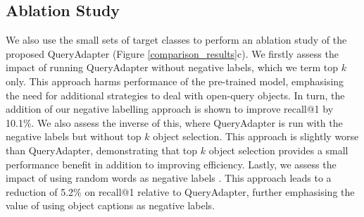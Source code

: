 
\vspace{-0.3em}
\subsection{Ablation Study}
We also use the small sets of target classes to perform an ablation study of the proposed QueryAdapter (Figure \ref{comparison_results}c). We firstly assess the impact of running QueryAdapter without negative labels, which we term top $k$ only. 
This approach harms performance of the pre-trained model, emphasising the need for additional strategies to deal with open-query objects. In turn, the addition of our negative labelling approach is shown to improve recall@1 by 10.1\%. 
We also assess the inverse of this, where QueryAdapter is run with the negative labels but without top $k$ object selection. 
This approach is slightly worse than QueryAdapter, demonstrating that top $k$ object selection provides a small performance benefit in addition to improving efficiency. 
Lastly, we assess the impact of using random words as negative labels \cite{open_vlm}. This approach leads to a reduction of 5.2\% on recall@1 relative to QueryAdapter, further emphasising the value of using object captions as negative labels. 

